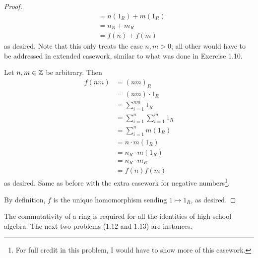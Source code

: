 \documentclass[../psets.tex]{subfiles}
\begin{document}
\begin{enumerate}[resume]
\begin{proof}
\begin{align*}
            &= n(1_R)+m(1_R)\\
            &= n_R+m_R\\
            &= f(n)+f(m)
        \end{align*}
        as desired. Note that this only treats the case $n,m>0$; all other would have to be addressed in extended casework, similar to what was done in Exercise 1.10.\par
        Let $n,m\in\mathbb{Z}$ be arbitrary. Then
        \begin{align*}
            f(nm) &= (nm)_R\\
            &= (nm)\cdot 1_R\\
            &= \sum_{i=1}^{nm}1_R\\
            &= \sum_{i=1}^n\sum_{i=1}^m1_R\\
            &= \sum_{i=1}^nm(1_R)\\
            &= n\cdot m(1_R)\\
            &= n_R\cdot m(1_R)\tag*{Problem 1.10}\\
            &= n_R\cdot m_R\\
            &= f(n)f(m)
        \end{align*}
        as desired. Same as before with the extra casework for negative numbers\footnote{For full credit in this problem, I would have to show more of this casework.}.\par
        By definition, $f$ is the unique homomorphism sending $1\mapsto 1_R$, as desired.
    \end{proof}
\end{enumerate}
The commutativity of a ring is required for all the identities of high school algebra. The next two problems (1.12 and 1.13) are instances.
\end{document}
